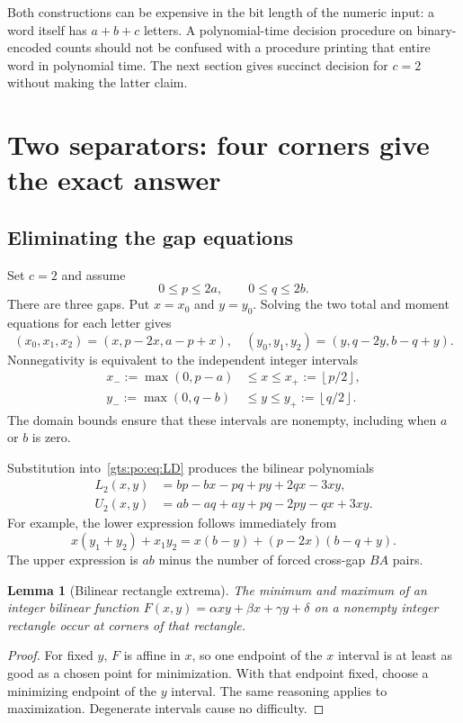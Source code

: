 \documentclass[11pt,letterpaper]{article}
\newtheorem{lemma}[theorem]{Lemma}
\theoremstyle{definition}
\theoremstyle{remark}
\newcommand{\floor}[1]{\left\lfloor #1\right\rfloor}
\begin{document}
Both constructions can be expensive in the bit length of the numeric input: a word itself has $a+b+c$ letters. A polynomial-time decision procedure on binary-encoded counts should not be confused with a procedure printing that entire word in polynomial time. The next section gives succinct decision for $c=2$ without making the latter claim.

\section{Two separators: four corners give the exact answer}
\subsection{Eliminating the gap equations}
Set $c=2$ and assume
\begin{equation}\label{gts:po:eq:c2domain}
 0\le p\le2a,\qquad 0\le q\le2b.
\end{equation}
There are three gaps. Put $x=x_0$ and $y=y_0$. Solving the two total and moment equations for each letter gives
\begin{equation}\label{gts:po:eq:c2vectors}
 (x_0,x_1,x_2)=(x,p-2x,a-p+x),\quad
 (y_0,y_1,y_2)=(y,q-2y,b-q+y).
\end{equation}
Nonnegativity is equivalent to the independent integer intervals
\begin{align}
 x_-:=\max(0,p-a)&\le x\le x_+:=\floor{p/2},\label{gts:po:eq:xbox}\\
 y_-:=\max(0,q-b)&\le y\le y_+:=\floor{q/2}.\label{gts:po:eq:ybox}
\end{align}
The domain bounds ensure that these intervals are nonempty, including when $a$ or $b$ is zero.

Substitution into~\eqref{gts:po:eq:LD} produces the bilinear polynomials
\begin{align}
 L_2(x,y)&=bp-bx-pq+py+2qx-3xy,\label{gts:po:eq:L2}\\
 U_2(x,y)&=ab-aq+ay+pq-2py-qx+3xy.\label{gts:po:eq:U2}
\end{align}
For example, the lower expression follows immediately from
\[
 x(y_1+y_2)+x_1y_2=x(b-y)+(p-2x)(b-q+y).
\]
The upper expression is $ab$ minus the number of forced cross-gap $BA$ pairs.

\begin{lemma}[Bilinear rectangle extrema]\label{gts:po:lem:corners}
The minimum and maximum of an integer bilinear function $F(x,y)=\alpha xy+\beta x+\gamma y+\delta$ on a nonempty integer rectangle occur at corners of that rectangle.
\end{lemma}
\begin{proof}
For fixed $y$, $F$ is affine in $x$, so one endpoint of the $x$ interval is at least as good as a chosen point for minimization. With that endpoint fixed, choose a minimizing endpoint of the $y$ interval. The same reasoning applies to maximization. Degenerate intervals cause no difficulty.
\end{proof}
\end{document}
